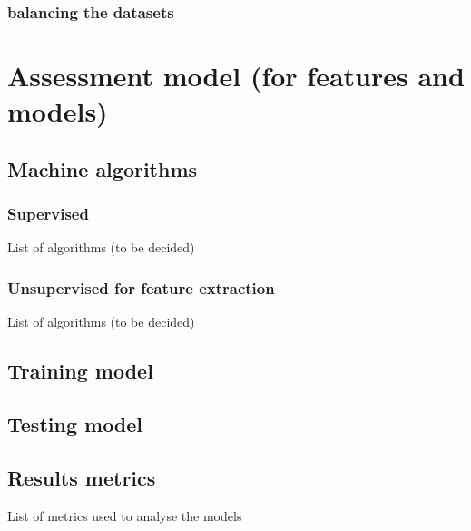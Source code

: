 \subsubsection{balancing the datasets}
\section{Assessment model (for features and models)}
\subsection{Machine algorithms}
\subsubsection{Supervised}
List of algorithms (to be decided)
\subsubsection{Unsupervised for feature extraction}
List of algorithms (to be decided)
\subsection{Training model}
\subsection{Testing model}
\subsection{Results metrics}
List of metrics used to analyse the models 
